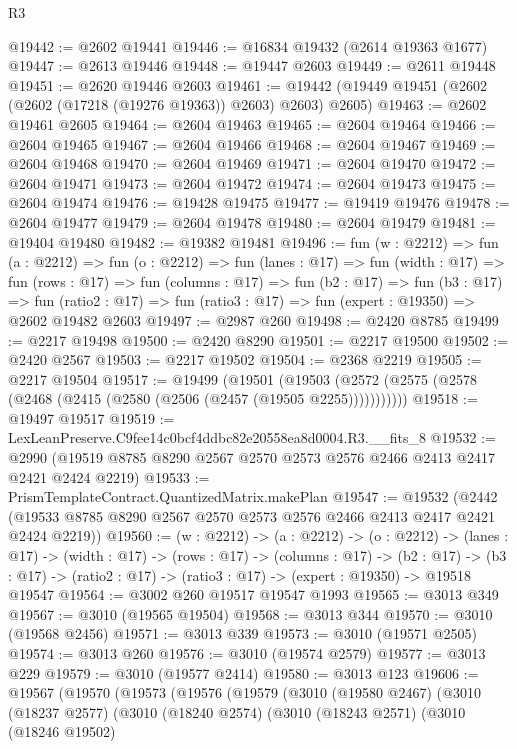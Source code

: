 \begin{lexlean}{R3}
\begin{coremodule}
@19442 := @2602 @19441
@19446 := @16834 @19432 (@2614 @19363 @1677)
@19447 := @2613 @19446
@19448 := @19447 @2603
@19449 := @2611 @19448
@19451 := @2620 @19446 @2603
@19461 := @19442 (@19449 @19451 (@2602 (@2602 (@17218 (@19276 @19363)) @2603) @2603) @2605)
@19463 := @2602 @19461 @2605
@19464 := @2604 @19463
@19465 := @2604 @19464
@19466 := @2604 @19465
@19467 := @2604 @19466
@19468 := @2604 @19467
@19469 := @2604 @19468
@19470 := @2604 @19469
@19471 := @2604 @19470
@19472 := @2604 @19471
@19473 := @2604 @19472
@19474 := @2604 @19473
@19475 := @2604 @19474
@19476 := @19428 @19475
@19477 := @19419 @19476
@19478 := @2604 @19477
@19479 := @2604 @19478
@19480 := @2604 @19479
@19481 := @19404 @19480
@19482 := @19382 @19481
@19496 := fun (w : @2212) =>
  fun (a : @2212) =>
  fun (o : @2212) =>
  fun (lanes : @17) =>
  fun (width : @17) =>
  fun (rows : @17) =>
  fun (columns : @17) =>
  fun (b2 : @17) =>
  fun (b3 : @17) =>
  fun (ratio2 : @17) => fun (ratio3 : @17) => fun (expert : @19350) => @2602 @19482 @2603
@19497 := @2987 @260
@19498 := @2420 @8785
@19499 := @2217 @19498
@19500 := @2420 @8290
@19501 := @2217 @19500
@19502 := @2420 @2567
@19503 := @2217 @19502
@19504 := @2368 @2219
@19505 := @2217 @19504
@19517 := @19499
    (@19501 (@19503 (@2572 (@2575 (@2578 (@2468 (@2415 (@2580 (@2506 (@2457 (@19505 @2255)))))))))))
@19518 := @19497 @19517
@19519 := LexLeanPreserve.C9fee14c0bcf4ddbc82e20558ea8d0004.R3.__fits_8
@19532 := @2990 (@19519 @8785 @8290 @2567 @2570 @2573 @2576 @2466 @2413 @2417 @2421 @2424 @2219)
@19533 := PrismTemplateContract.QuantizedMatrix.makePlan
@19547 := @19532
    (@2442 (@19533 @8785 @8290 @2567 @2570 @2573 @2576 @2466 @2413 @2417 @2421 @2424 @2219))
@19560 := (w : @2212) ->
  (a : @2212) ->
  (o : @2212) ->
  (lanes : @17) ->
  (width : @17) ->
  (rows : @17) ->
  (columns : @17) ->
  (b2 : @17) -> (b3 : @17) -> (ratio2 : @17) -> (ratio3 : @17) -> (expert : @19350) -> @19518 @19547
@19564 := @3002 @260 @19517 @19547 @1993
@19565 := @3013 @349
@19567 := @3010 (@19565 @19504)
@19568 := @3013 @344
@19570 := @3010 (@19568 @2456)
@19571 := @3013 @339
@19573 := @3010 (@19571 @2505)
@19574 := @3013 @260
@19576 := @3010 (@19574 @2579)
@19577 := @3013 @229
@19579 := @3010 (@19577 @2414)
@19580 := @3013 @123
@19606 := @19567
    (@19570
      (@19573
        (@19576
          (@19579
            (@3010
              (@19580 @2467)
              (@3010
                (@18237 @2577)
                (@3010
                  (@18240 @2574)
                  (@3010
                    (@18243 @2571)
                    (@3010
                      (@18246 @19502)

\end{coremodule}
\end{lexlean}
